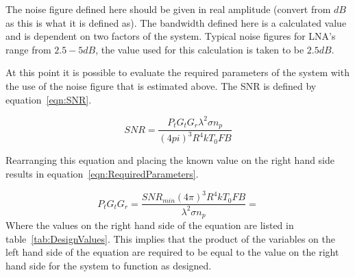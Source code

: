 \documentclass[11pt]{witseiepaper}
\begin{document}
The noise figure defined here should be given in real amplitude (convert from $dB$ as this is what it is defined as). The bandwidth defined here is a calculated value and is dependent on two factors of the system. Typical noise figures for LNA's range from $2.5 - 5 dB$, the value used for this calculation is taken to be $2.5 dB$.



At this point it is possible to evaluate the required parameters of the system with the use of the noise figure that is estimated above.
The SNR is defined by equation~\ref{eqn:SNR}.

\begin{equation} \label{eqn:SNR}
SNR = \frac{P_{t} G_{t} G_{r} \lambda^2 \sigma n_p}{(4 pi)^3 R^4 k T_0 F B}
\end{equation}


Rearranging this equation and placing the known value on the right hand side results in equation~\ref{eqn:RequiredParameters}.

\begin{equation} \label{eqn:RequiredParameters}
P_{t} G_{t} G_{r} = \frac{SNR_{min} (4 \pi )^3 R^4 k T_{0} F B}{{\lambda}^2 \sigma n_p} = 
\end{equation}
Where the values on the right hand side of the equation are listed in table~\ref{tab:DesignValues}.
This implies that the product of the variables on the left hand side of the equation are required to be equal to the value on the right hand side for the system to function as designed.
\end{document}
